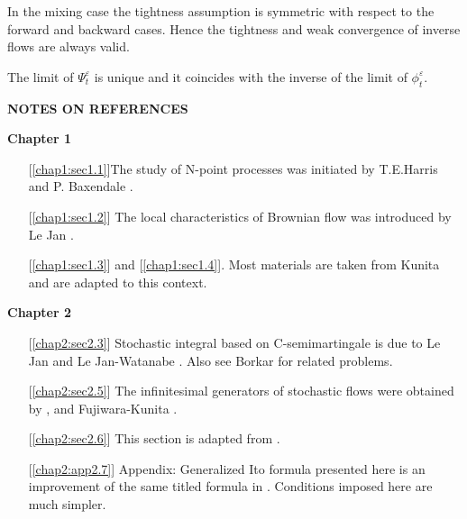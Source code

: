 \setcounter{remark}{1}
\begin{remark}\label{c3:rem3.11.2}%
  In the mixing case the tightness assumption is symmetric with
  respect to the forward and backward cases. Hence the tightness and
  weak convergence of inverse flows are always valid. 
\end{remark}


\begin{remark}\label{c3:rem3.11.3}%
  The limit of $\Psi^\varepsilon_t$ is unique and it coincides with
  the inverse of the limit of $\phi^\varepsilon_t$. 
\end{remark}

\newpage

\begin{center}
\textbf{NOTES ON REFERENCES}\pageoriginale
\end{center}

\noindent
\textbf{Chapter 1}
\begin{itemize} 
\item[] [\ref{chap1:sec1.1}]The study of N-point processes was initiated by T.E.Harris
  \cite{9} and P. Baxendale \cite{1}. 

\item[] [\ref{chap1:sec1.2}] The local characteristics of Brownian flow was introduced
  by Le Jan \cite{23}. 

\item[] [\ref{chap1:sec1.3}] and [\ref{chap1:sec1.4}]. Most materials are taken from Kunita \cite{18} and
  are ada\-pted to this context. 
\end{itemize}

\noindent
\textbf{Chapter 2}
\begin{itemize}
\item[] [\ref{chap2:sec2.3}] Stochastic integral based on C-semimartingale is due to
  Le Jan \cite{23} and Le Jan-Watanabe \cite{24}. Also see Borkar \cite{4} for
  related problems. 

\item[] [\ref{chap2:sec2.5}] The infinitesimal generators of stochastic flows were
  obtained by \cite{23}, \cite{24} and Fujiwara-Kunita \cite{8}. 

\item[] [\ref{chap2:sec2.6}] This section is adapted from \cite{18}.

\item[] [\ref{chap2:app2.7}] Appendix:  Generalized Ito formula presented here is an
  improvement of the same titled formula in \cite{18}. Conditions imposed
  here are much simpler. 
\end{itemize}

